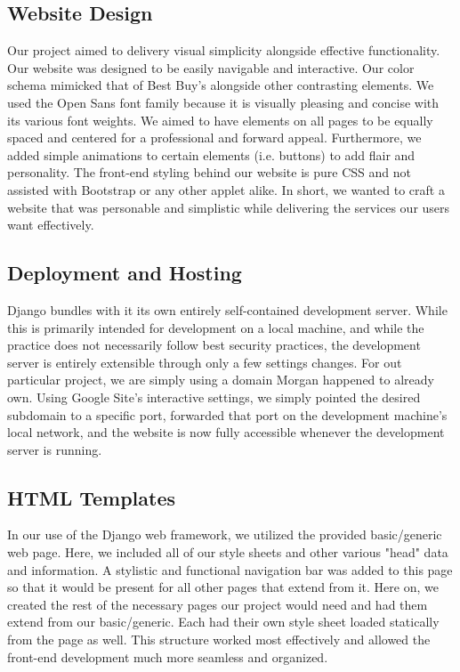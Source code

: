 \documentclass[sigconf]{acmart}
\begin{document}
\subsection{Website Design}\label{website}
Our project aimed to delivery visual simplicity alongside effective functionality. Our website was designed to be easily navigable and interactive. Our color schema mimicked that of Best Buy's alongside other contrasting elements. We used the Open Sans font family because it is visually pleasing and concise with its various font weights. We aimed to have elements on all pages to be equally spaced and centered for a professional and forward appeal. Furthermore, we added simple animations to certain elements (i.e. buttons) to add flair and personality. The front-end styling behind our website is pure CSS and not assisted with Bootstrap or any other applet alike. In short, we wanted to craft a website that was personable and simplistic while delivering the services our users want effectively.

\subsection{Deployment and Hosting}\label{hosting}
Django bundles with it its own entirely self-contained development server. While this is primarily intended for development on a local machine, and while the practice does not necessarily follow best security practices, the development server is entirely extensible through only a few settings changes. For out particular project, we are simply using a domain Morgan happened to already own. Using Google Site's interactive settings, we simply pointed the desired subdomain to a specific port, forwarded that port on the development machine's local network, and the website is now fully accessible whenever the development server is running.

\pagebreak
\subsection{HTML Templates}\label{templates}
In our use of the Django web framework, we utilized the provided basic/generic web page. Here, we included all of our style sheets and other various "head" data and information. A stylistic and functional navigation bar was added to this page so that it would be present for all other pages that extend from it. Here on, we created the rest of the necessary pages our project would need and had them extend from our basic/generic. Each had their own style sheet loaded statically from the page as well. This structure worked most effectively and allowed the front-end development much more seamless and organized.
\end{document}
